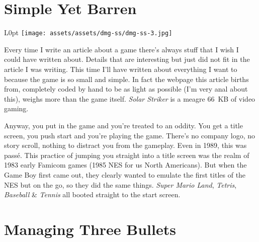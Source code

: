 \documentclass{book}
\begin{document}
\FloatBarrier\needspace{5pt}\section*{Simple Yet Barren}\nopagebreak[4]

\begin{wrapfigure}{L}{0pt} \texttt{[image: assets/assets/dmg-ss/dmg-ss-3.jpg]}\end{wrapfigure}
Every time I write an article about a game there’s always stuff that I wish I could have written about. Details that are interesting but just did not fit in the article I was writing. This time I’ll have written about everything I want to because the game is so small and simple. In fact the webpage this article births from, completely coded by hand to be as light as possible (I’m very anal about this), weighs more than the game itself. \emph{Solar Striker} is a meagre 66 KB of video gaming.

Anyway, you put in the game and you’re treated to an oddity. You get a title screen, you push start and you’re playing the game. There’s no company logo, no story scroll, nothing to distract you from the gameplay. Even in 1989, this was passé. This practice of jumping you straight into a title screen was the realm of 1983 early Famicom games (1985 NES for us North Americans). But when the Game Boy first came out, they clearly wanted to emulate the first titles of the NES but on the go, so they did the same things. \emph{Super Mario Land}, \emph{Tetris}, \emph{Baseball} \& \emph{Tennis} all booted straight to the start screen.

\FloatBarrier\needspace{5pt}\section*{Managing Three Bullets}\nopagebreak[4]
\end{document}
